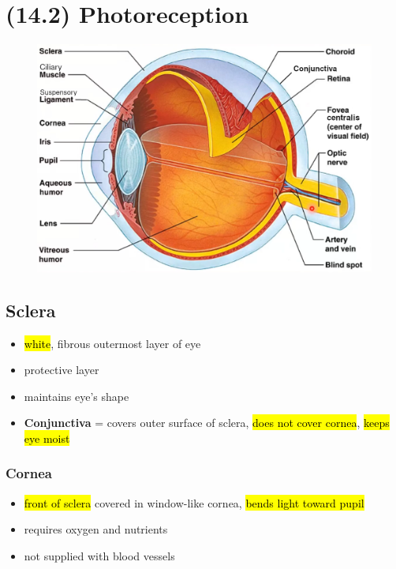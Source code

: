 \documentclass[a4paper,12pt]{article}
\begin{document}
\pagebreak

\section{(14.2) Photoreception}

\begin{figure}[H]
    \centering
    \includegraphics[width=\textwidth]{eye}
\end{figure}

\subsection{Sclera}
\begin{itemize}
    \item{\hl{white}, fibrous outermost layer of eye}
    \item{protective layer}
    \item{maintains eye's shape}
    \item{\textbf{Conjunctiva} = covers outer surface of sclera, \hl{does not cover cornea}, \hl{keeps eye moist}}
\end{itemize}

\subsubsection{Cornea}
\begin{itemize}
    \item{\hl{front of sclera} covered in window-like cornea, \hl{bends light toward pupil}}
    \item{requires oxygen and nutrients}
    \item{not supplied with blood vessels}
\end{itemize}
\end{document}
